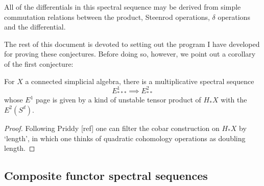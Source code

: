 \documentclass[11pt]{article}
\newcommand{\Sq}{\mathrm{Sq}}
\begin{document}
\begin{conjecture}
All of the differentials in this spectral sequence may be derived from simple commutation relations between the product, Steenrod operations, $\delta$ operations and the differential.
\end{conjecture}
The rest of this document is devoted to setting out the program I have developed for proving these conjectures. Before doing so, however, we point out a corollary of the first conjecture:
\begin{cor*}
For $X$ a connected simplicial algebra, there is a multiplicative spectral sequence 
\[E^1_{***}\implies E^2_{**}\]
whose $E^1$ page is given by a kind of unstable tensor product of $H_*X$ with the $E^2(S^d)$.
\end{cor*}
\begin{proof}
Following Priddy [ref] one can filter the cobar construction on $H_*X$ by `length', in which one thinks of quadratic cohomology operations as doubling length.
\end{proof}
\subsection*{Composite functor spectral sequences}
\end{document}
